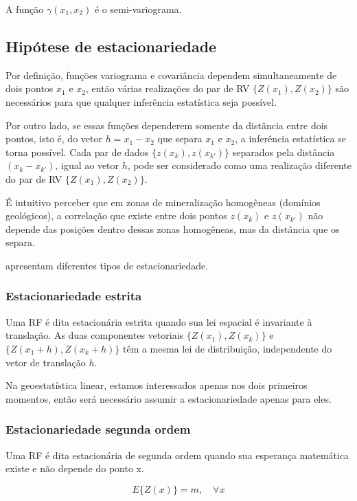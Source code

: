 A função $\gamma(x_1,x_2)$ é o semi-variograma.
				
\subsection{Hipótese de estacionariedade}
		
Por definição, funções variograma e covariância dependem simultaneamente de dois pontos $x_1$ e $x_2$, então várias realizações do par de RV $\{Z(x_1),Z(x_2)\}$ são necessários para que qualquer inferência estatística seja possível.
			
Por outro lado, se essas funções dependerem somente da distância entre dois pontos, isto é, do vetor $h=x_1-x_2$ que separa $x_1$ e $x_2$, a inferência estatística se torna possível. Cada par de dados $\{z(x_k),z(x_{k'})\}$ separados pela distância $(x_k-x_{k'})$, igual ao vetor $h$, pode ser considerado como uma realização diferente do par de RV $\{Z(x_1),Z(x_2)\}$.
			
É intuitivo perceber que em zonas de mineralização homogêneas (domínios geológicos), a correlação que existe entre dois pontos $z(x_k)$ e $z(x_{k'})$ não depende das posições dentro dessas zonas homogêneas, mas da distância que os separa.
			
 apresentam diferentes tipos de estacionariedade. 
		
\subsubsection{Estacionariedade estrita}
				
Uma RF é dita estacionária estrita quando sua lei espacial é invariante à translação. As duas componentes vetoriais $\{Z(x_1),Z(x_k)\}$ e $\{Z(x_1+h),Z(x_k+h)\}$ têm a mesma lei de distribuição, independente do vetor de translação $h$.
				
Na geoestatística linear, estamos interessados apenas nos dois primeiros momentos, então será necessário assumir a estacionariedade apenas para eles.
				
\subsubsection{Estacionariedade segunda ordem}
			
Uma RF é dita estacionária de segunda ordem quando sua esperança matemática existe e não depende do ponto x.

\begin{equation}
	E\{Z(x)\}=m, \quad \forall x
\end{equation}
					
